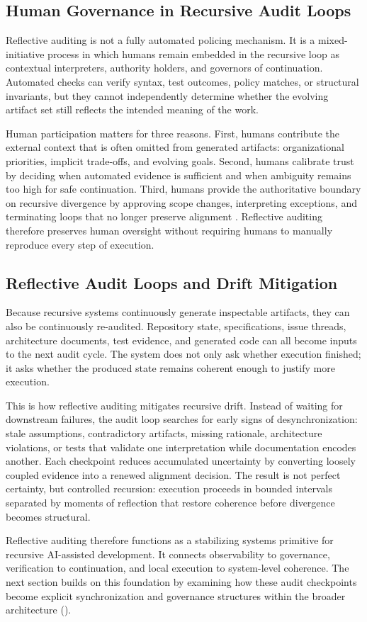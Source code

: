 \subsection{Human Governance in Recursive Audit Loops}

Reflective auditing is not a fully automated policing mechanism. It is a mixed-initiative process in which humans remain embedded in the recursive loop as contextual interpreters, authority holders, and governors of continuation. Automated checks can verify syntax, test outcomes, policy matches, or structural invariants, but they cannot independently determine whether the evolving artifact set still reflects the intended meaning of the work.

Human participation matters for three reasons. First, humans contribute the external context that is often omitted from generated artifacts: organizational priorities, implicit trade-offs, and evolving goals. Second, humans calibrate trust by deciding when automated evidence is sufficient and when ambiguity remains too high for safe continuation. Third, humans provide the authoritative boundary on recursive divergence by approving scope changes, interpreting exceptions, and terminating loops that no longer preserve alignment \cite{Hutchins1995CognitionWild,Shneiderman2020HCAI}. Reflective auditing therefore preserves human oversight without requiring humans to manually reproduce every step of execution.

\subsection{Reflective Audit Loops and Drift Mitigation}

Because recursive systems continuously generate inspectable artifacts, they can also be continuously re-audited. Repository state, specifications, issue threads, architecture documents, test evidence, and generated code can all become inputs to the next audit cycle. The system does not only ask whether execution finished; it asks whether the produced state remains coherent enough to justify more execution.

This is how reflective auditing mitigates recursive drift. Instead of waiting for downstream failures, the audit loop searches for early signs of desynchronization: stale assumptions, contradictory artifacts, missing rationale, architecture violations, or tests that validate one interpretation while documentation encodes another. Each checkpoint reduces accumulated uncertainty by converting loosely coupled evidence into a renewed alignment decision. The result is not perfect certainty, but controlled recursion: execution proceeds in bounded intervals separated by moments of reflection that restore coherence before divergence becomes structural.

Reflective auditing therefore functions as a stabilizing systems primitive for recursive AI-assisted development. It connects observability to governance, verification to continuation, and local execution to system-level coherence. The next section builds on this foundation by examining how these audit checkpoints become explicit synchronization and governance structures within the broader  architecture ().
